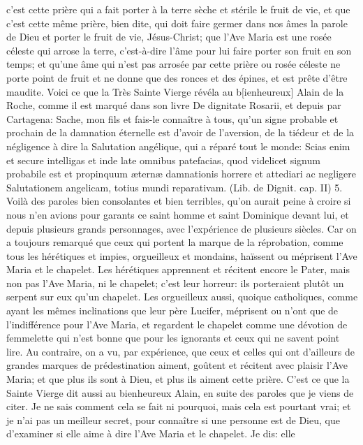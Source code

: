 c'est cette prière qui a fait porter à la terre sèche et stérile le fruit de vie, et que c'est cette même prière, bien dite,
qui doit faire germer dans nos âmes la parole de Dieu et porter le fruit de vie, Jésus-Christ; que l'Ave Maria est une
rosée céleste qui arrose la terre, c'est-à-dire l'âme pour lui faire porter son fruit en son temps; et qu'une âme qui
n'est pas arrosée par cette prière ou rosée céleste ne porte point de fruit et ne donne que des ronces et des
épines, et est prête d'être maudite.
 Voici ce que la Très Sainte Vierge révéla au b[ienheureux] Alain de la Roche, comme il est marqué dans son
livre De dignitate Rosarii, et depuis par Cartagena: Sache, mon fils et fais-le connaître à tous, qu'un signe probable
et prochain de la damnation éternelle est d'avoir de l'aversion, de la tiédeur et de la négligence à dire la Salutation
angélique, qui a réparé tout le monde: Scias enim et secure intelligas et inde late omnibus patefacias, quod
videlicet signum probabile est et propinquum æternæ damnationis horrere et attediari ac negligere Salutationem
angelicam, totius mundi reparativam. (Lib. de Dignit. cap. II) 5. Voilà des paroles bien consolantes et bien terribles,
qu'on aurait peine à croire si nous n'en avions pour garants ce saint homme et saint Dominique devant lui, et
depuis plusieurs grands personnages, avec l'expérience de plusieurs siècles. Car on a toujours remarqué que
ceux qui portent la marque de la réprobation, comme tous les hérétiques et impies, orgueilleux et mondains,
haïssent ou méprisent l'Ave Maria et le chapelet. Les hérétiques apprennent et récitent encore le Pater, mais non
pas l'Ave Maria, ni le chapelet; c'est leur horreur: ils porteraient plutôt un serpent sur eux qu'un chapelet. Les
orgueilleux aussi, quoique catholiques, comme ayant les mêmes inclinations que leur père Lucifer, méprisent ou
n'ont que de l'indifférence pour l'Ave Maria, et regardent le chapelet comme une dévotion de femmelette qui n'est
bonne que pour les ignorants et ceux qui ne savent point lire. Au contraire, on a vu, par expérience, que ceux et
celles qui ont d'ailleurs de grandes marques de prédestination aiment, goûtent et récitent avec plaisir l'Ave Maria;
et que plus ils sont à Dieu, et plus ils aiment cette prière. C'est ce que la Sainte Vierge dit aussi au bienheureux
Alain, en suite des paroles que je viens de citer.
 Je ne sais comment cela se fait ni pourquoi, mais cela est pourtant vrai; et je n'ai pas un meilleur secret, pour
connaître si une personne est de Dieu, que d'examiner si elle aime à dire l'Ave Maria et le chapelet. Je dis: elle
